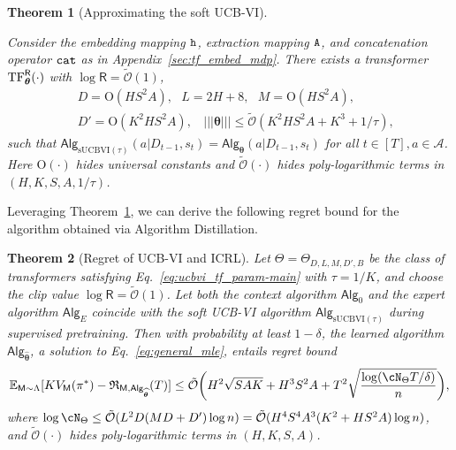 \documentclass[10pt]{article}
\newtheorem{theorem}{Theorem}
\newcommand{\<}{\left\langle}
\renewcommand{\>}{\right\rangle}
\newcommand{\TF}{{\rm TF}}
\newcommand{\nrmp}[1]{{\left|\!\left|\!\left|{#1}\right|\!\right|\!\right|}}
\newcommand{\E}{\mathbb{E}}
\newcommand{\inst}{{\mathsf{M}}}
\newcommand{\temp}{{\tau}}
\newcommand{\tcO}{{\tilde{\mathcal O}}}
\newcommand{\state}{{s}}
\newcommand{\action}{{a}}
\newcommand{\totlen}{{T}}
\newcommand{\cat}{{\tt cat}}
\newcommand{\extractmap}{{\tt A}}
\newcommand{\embedmap}{{\tt h}}
\newcommand{\sAlg}{{\mathsf{Alg}}}
\newcommand{\dset}{{D}}
\newcommand{\Numobs}{{n}}
\newcommand{\Parspace}{{\Theta}}
\newcommand{\esttfpar}{{\widehat{\btheta}}}
\newcommand{\plc}{{\pi}}
\newcommand{\prior}{{\Lambda}}
\newcommand{\Numepi}{{K}}
\newcommand{\horizon}{{H}}
\newcommand{\actionsp}{{\mathcal{A}}}
\renewcommand{\horizon}{{H}}
\newcommand{\valuefun}{{V}}
\newcommand{\shortexp}{{E}}
\newcommand{\tfpar}{{\btheta}}
\newcommand{\layer}{{L}}
\newcommand{\hidden}{{D'}}
\newcommand{\head}{{M}}
\newcommand{\clipval}{{\mathsf{R}}}
\newcommand{\embd}{{D}}
\newcommand{\totreward}{{\mathfrak{R}}}
\newcommand{\Numst}{{S}}
\newcommand{\Numact}{{A}}
\newcommand{\Vfun}{{\valuefun}}
\newcommand{\sUCBVI}{{\mathrm{sUCBVI}}}
\newcommand{\conO}{{\mathrm{O}}}
\def\btheta{{\boldsymbol \theta}}
\begin{document}
\begin{theorem}[Approximating the soft UCB-VI]\label{thm:approx_ucbvi}

Consider the embedding mapping $\embedmap$, extraction mapping $\extractmap$, and concatenation operator $\cat$ as in Appendix~\ref{sec:tf_embed_mdp}. There exists a transformer $\TF_\btheta^{\clipval}(\cdot)$ with $\log \clipval = \tcO(1)$, 
\begin{equation}\label{eq:ucbvi_tf_param-main}
\begin{aligned}
&~D =\conO(\horizon\Numst^2\Numact),~~~L= 2\horizon+8,~~~M= \conO(\horizon\Numst^2\Numact),\\
&~\hidden= \conO(\Numepi^2\horizon\Numst^2\Numact),~~~~\nrmp{\btheta}\leq \tcO(\Numepi^2\horizon\Numst^2\Numact+\Numepi^3+1/\temp),
\end{aligned} 
\end{equation}
such that 
$\sAlg_{\sUCBVI(\tau)}(\action|\dset_{t-1},\state_t) = \sAlg_{\tfpar}(\action|\dset_{t-1},\state_t)$ for all $t\in[T],\action\in\actionsp$. Here $\conO(\cdot)$ hides universal constants and $\tcO(\cdot)$  hides poly-logarithmic terms in $(\horizon,\Numepi,\Numst,\Numact,1/\temp)$. 
\end{theorem}

Leveraging Theorem~\ref{thm:approx_ucbvi}, we can derive the following regret bound for the algorithm obtained via Algorithm Distillation. 

\begin{theorem}[Regret of UCB-VI and ICRL]\label{thm:ucbvi_icrl-main}
Let $\Theta = \Theta_{D, L, M, \hidden, B}$ be the class of transformers satisfying Eq.~\eqref{eq:ucbvi_tf_param-main} with $\temp = 1/\Numepi$, and choose the clip value $\log \clipval = \tcO(1)$. Let both the context algorithm $\sAlg_0$ and the expert algorithm $\sAlg_\shortexp$ coincide with the soft UCB-VI algorithm $\sAlg_{\sUCBVI(\tau)}$ during supervised pretraining.  Then with probability at least $1-\delta$, the learned algorithm $\sAlg_{\esttfpar}$, a solution to Eq.~\eqref{eq:general_mle}, entails regret bound
\begin{align*}
\E_{\inst\sim\prior}[\Numepi\Vfun_\inst(\plc^*)-\totreward_{\inst,\sAlg_\esttfpar}(\totlen)]\leq \tcO \bigg(\horizon^2\sqrt{\Numst\Numact\Numepi}+\horizon^3\Numst^2\Numact+\totlen^2\sqrt{\frac{\log ( \cN_{\Parspace} \totlen/\delta ) }{n} } \bigg),
\end{align*}
where $\log \cN_{\Parspace} \le \tcO(\layer^2\embd(\head\embd+\hidden) \log\Numobs) = \tcO(\horizon^4\Numst^4\Numact^3(\Numepi^2+\horizon\Numst^2\Numact)\log\Numobs)$, and $\tcO(\cdot)$ hides poly-logarithmic terms in $(\horizon,\Numepi,\Numst,\Numact)$. 
\end{theorem}
\end{document}
